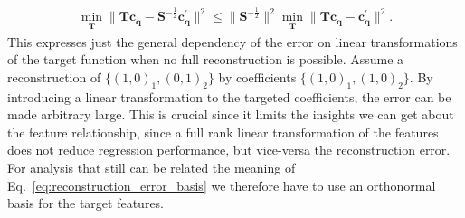 \begin{subequations}
\begin{align}
  \min_\mathbf{T} \|\mathbf{T}\mathbf{c}_\mathbf{q} - \mathbf{S}^{-\frac12}\mathbf{c}^\prime_\mathbf{q}\|^2 
  \leq \|\mathbf{S}^{-\frac12}\|^2 \min_\mathbf{T} \|\mathbf{T}\mathbf{c}_\mathbf{q} - \mathbf{c}^\prime_\mathbf{q}\|^2.
\end{align}
\end{subequations}
This expresses just the general dependency of the error on linear transformations of the target function when no full reconstruction is possible.
Assume a reconstruction of $\{(1, 0)_1, (0, 1)_2\}$ by coefficients $\{(1, 0)_1, (1, 0)_2\}$.
By introducing a linear transformation to the targeted coefficients, the error can be made arbitrary large.
This is crucial since it limits the insights we can get about the feature relationship, since a full rank linear transformation of the features does not reduce regression performance, but vice-versa the reconstruction error.
For analysis that still can be related the meaning of Eq.~\ref{eq:reconstruction_error_basis} we therefore have to use an orthonormal basis for the target features.
